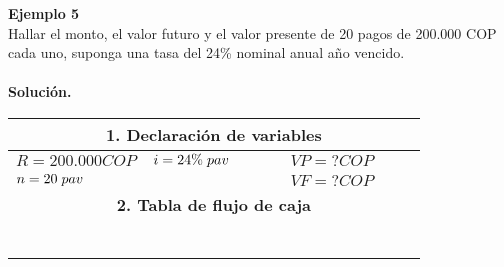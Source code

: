 \textbf{Ejemplo 5}\\
Hallar el monto, el valor futuro y el valor presente de 20 pagos de 200.000 COP cada uno, suponga una tasa del 24\% nominal anual año vencido.\\ \\
\textbf{Solución.}
\begin{center}
 \renewcommand{\arraystretch}{1.5}%
 \begin{longtable}[H]{|p{0.333\linewidth}|p{0.3333\linewidth}|p{0.3333\linewidth}|}
  \hline
  \multicolumn{3}{|c|}{\cellcolor[HTML]{FFB183}\textbf{1. Declaración de variables}}                   \\ \hline
  $R= 200.000 COP$         & $i=24\% \hspace{1mm} pav$ & $VP = ? COP$                                  \\
  $n=20 \hspace{1mm} pav$ &                            & $VF= ? COP$                                   \\ \hline
  \multicolumn{3}{|c|}{\cellcolor[HTML]{FFB183}\textbf{2. Tabla de flujo de caja}}                     \\ \hline
  \multicolumn{3}{|p{\columnwidth}|}{
  \begin{center}
   \begin{tabular}{ |p{3.5cm}| p{3cm}|}
    \hline


\end{tabular}
\end{center}}
\end{longtable}
\end{center}
